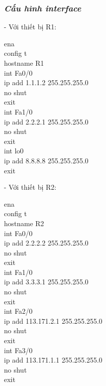\documentclass[12pt, a4paper]{article}
\begin{document}
	\subsubsection{\textit{Cấu hình interface}}
	\begin{flushleft}
		- Với thiết bị R1:
		\begin{tcolorbox}
			ena\\
			config t\\
			hostname R1\\
			int Fa0/0\\
			ip add 1.1.1.2 255.255.255.0\\
			no shut\\
			exit\\
			int Fa1/0\\
			ip add 2.2.2.1 255.255.255.0\\
			no shut\\
			exit\\
			int lo0\\
			ip add 8.8.8.8 255.255.255.0\\
			exit 
		\end{tcolorbox}
		
		\newpage
		- Với thiết bị R2:
		\begin{tcolorbox}
			ena\\
			config t\\
			hostname R2\\
			int Fa0/0\\
			ip add 2.2.2.2 255.255.255.0\\
			no shut\\
			exit\\
			int Fa1/0\\
			ip add 3.3.3.1 255.255.255.0\\
			no shut\\
			exit\\
			int Fa2/0\\
			ip add 113.171.2.1 255.255.255.0\\
			no shut\\
			exit\\
			int Fa3/0\\
			ip add 113.171.1.1 255.255.255.0\\
			no shut\\
			exit
		\end{tcolorbox}
		

\end{flushleft}
\end{document}
